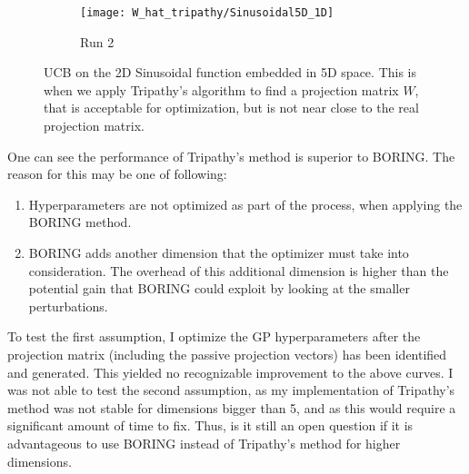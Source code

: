 \begin{figure}[H]
	\centering
    \begin{subfigure}[b]{0.5\textwidth}
        \texttt{[image: W\_hat\_tripathy/Sinusoidal5D\_1D]}
        \label{fig:tiger}
        \caption{Run 2}
    \end{subfigure}   
           \caption{UCB on the 2D Sinusoidal function embedded in 5D space.
  This is when we apply Tripathy's algorithm to find a projection matrix $W$, that is acceptable for optimization, but is not near close to the real projection matrix.}
\end{figure}

One can see the performance of Tripathy's method is superior to BORING.
The reason for this may be one of following:

\begin{enumerate}
\item Hyperparameters are not optimized as part of the process, when applying the BORING method.
\item BORING adds another dimension that the optimizer must take into consideration.
The overhead of this additional dimension is higher than the potential gain that BORING could exploit by looking at the smaller perturbations.
\end{enumerate}

To test the first assumption, I optimize the GP hyperparameters after the projection matrix (including the passive projection vectors) has been identified and generated.
This yielded no recognizable improvement to the above curves.
I was not able to test the second assumption, as my implementation of Tripathy's method was not stable for dimensions bigger than 5, and as this would require a significant amount of time to fix.
Thus, is it still an open question if it is advantageous to use BORING instead of Tripathy's method for higher dimensions.


